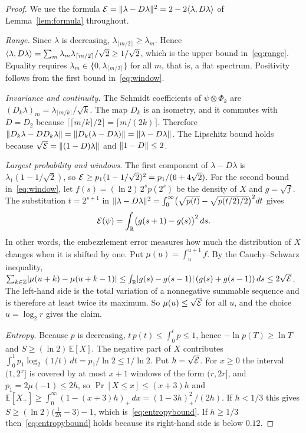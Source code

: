 \begin{proof}
We use the formula $\mathcal{E}=\lVert \lambda-D\lambda\rVert^2=2-2\langle \lambda,D\lambda\rangle$ of
Lemma~\ref{lem:formula} throughout.

\emph{Range.} Since $\lambda$ is decreasing, $\lambda_{\lceil m/2\rceil}\ge\lambda_m$. Hence
$\langle \lambda,D\lambda\rangle=\sum_m\lambda_m\lambda_{\lceil m/2\rceil}/\sqrt2\ge1/\sqrt2$, which is
the upper bound in~\eqref{eq:range}. Equality requires
$\lambda_m\in\{0,\lambda_{\lceil m/2\rceil}\}$ for all $m$, that is, a flat spectrum. Positivity
follows from the first bound in~\eqref{eq:window}.

\emph{Invariance and continuity.} The Schmidt coefficients of $\psi\otimes\Phi_k$ are
$(D_k\lambda)_m=\lambda_{\lceil m/k\rceil}/\sqrt k$. The map $D_k$ is an isometry, and it
commutes with $D=D_2$ because $\lceil\lceil m/k\rceil/2\rceil=\lceil m/(2k)\rceil$. Therefore
$\lVert D_k\lambda-DD_k\lambda\rVert=\lVert D_k(\lambda-D\lambda)\rVert=\lVert \lambda-D\lambda\rVert$. The
Lipschitz bound holds because $\sqrt{\mathcal{E}}=\lVert (1-D)\lambda\rVert$ and $\lVert 1-D\rVert\le2$.

\emph{Largest probability and windows.} The first component of $\lambda-D\lambda$ is
$\lambda_1(1-1/\sqrt2)$, so $\mathcal{E}\ge p_1(1-1/\sqrt2)^2=p_1/(6+4\sqrt2)$. For the second bound
in~\eqref{eq:window}, let $f(s)=(\ln2)\,2^sp(2^s)$ be the density of $X$ and $g=\sqrt f$. The
substitution $t=2^{s+1}$ in
$\lVert \lambda-D\lambda\rVert^2=\int_0^\infty\bigl(\sqrt{p(t)}-\sqrt{p(t/2)/2}\bigr)^2dt$ gives
\begin{equation}\label{eq:Eshift}
\mathcal{E}(\psi)=\int_{\mathbb{R}}\bigl(g(s+1)-g(s)\bigr)^2\,ds .
\end{equation}
In other words, the embezzlement error measures how much the distribution of $X$ changes when
it is shifted by one. Put $\mu(u)=\int_u^{u+1}f$. By the Cauchy--Schwarz inequality,
$\sum_{k\in\mathbb{Z}}\lvert\mu(u+k)-\mu(u+k-1)\rvert\le\int_{\mathbb{R}}\lvert g(s)-g(s-1)\rvert\,(g(s)+g(s-1))\,ds\le2\sqrt{\mathcal{E}}$.
The left-hand side is the total variation of a nonnegative summable sequence and is therefore
at least twice its maximum. So $\mu(u)\le\sqrt{\mathcal{E}}$ for all $u$, and the choice $u=\log_2r$
gives the claim.

\emph{Entropy.} Because $p$ is decreasing, $t\,p(t)\le\int_0^tp\le1$, hence
$-\ln p(T)\ge\ln T$ and $S\ge(\ln2)\,\mathbb{E}[X]$. The negative part of $X$ contributes
$\int_0^1p_1\log_2(1/t)\,dt=p_1/\ln2\le1/\ln 2$. Put $h=\sqrt{\mathcal{E}}$. For $x\ge0$ the interval
$(1,2^x]$ is covered by at most $x+1$ windows of the form $(r,2r]$, and $p_1=2\mu(-1)\le2h$, so
$\Pr[X\le x]\le(x+3)h$ and
$\mathbb{E}[X_+]\ge\int_0^\infty(1-(x+3)h)_+\,dx=(1-3h)_+^2/(2h)$. If $h<1/3$ this gives
$S\ge(\ln2)\bigl(\tfrac1{2h}-3\bigr)-1$, which is~\eqref{eq:entropybound}. If $h\ge1/3$
then~\eqref{eq:entropybound} holds because its right-hand side is below $0.12$.


\end{proof}
